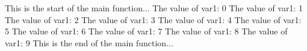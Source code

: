 This is the start of the main function...
The value of var1: 0
The value of var1: 1
The value of var1: 2
The value of var1: 3
The value of var1: 4
The value of var1: 5
The value of var1: 6
The value of var1: 7
The value of var1: 8
The value of var1: 9
This is the end of the main function...
